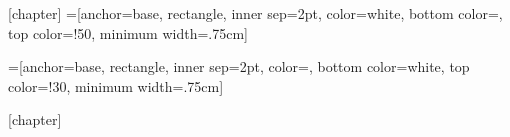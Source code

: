 \makeatother

\newcommand{\resetexos}{\def\exos{0}}

[chapter]
=[anchor=base,%
rectangle,%
inner sep=2pt,%
color=white,
bottom color=\scriptcolor,%
top color=\scriptcolor!50,%
minimum width=.75cm]

\newcommand{\kescht}[1]{\tikz[baseline]{\node[exosty] (exo) {\bfseries\textsf{#1}};}}

\newcommand{\exo}
{\par%
	\refstepcounter{exo}%
	\noindent%
	\tikz[baseline]{\node[exosty] (exo) {\bfseries\textsf{\theexo}};}
}




\newenvironment{exercices}[1][Exercices]
{\phantomsection%
	\addcontentsline{toc}{section}{Exercices}%
	\medskip%
	\btitle{\Large #1}%
	\vspace{-1.75\baselineskip}%
	\begin{multicols}{2}%
		\setenumerate[1]{label=\alph*), ref=\theenumi.\alph*}
		\setenumerate[2]{label=\roman*), ref=\theenumii.\roman*} 
	}
	{\setenumerate[1]{ label=\arabic*. , ref=\arabic*, itemsep=1mm}
		\setenumerate[2]{label=\alph*), ref=\theenumi.\alph*}
		\setenumerate[3]{label=\roman*), ref=\theenumii.\roman*} 
	\end{multicols}%
	\vspace{-.5cm}%
	\noindent\color{\scriptcolor}\rule[0cm]{\textwidth}{1.5pt}%
}



=[anchor=base,%
rectangle,%
inner sep=2pt,%
color=\scriptcolor,%
bottom color=white,%
top color=\scriptcolor!30,%
minimum width=.75cm]

\newcommand{\sol}
{\par%
	\refstepcounter{sol}%
	\noindent%
	\tikz[baseline]{\node[solsty] (sol) {\bfseries\textsf{\thesol}};}
}

[chapter]
\newenvironment{solutions}[1][Solutions]
{\phantomsection%
	\addcontentsline{toc}{section}{Solutions}%
	\medskip%
	\btitleinv{\Large #1}%
	\vspace{-1.75\baselineskip}%
	\begin{multicols}{2}%
		\setenumerate[1]{label=\alph*), ref=\theenumi.\alph*}
		\setenumerate[2]{label=\roman*), ref=\theenumii.\roman*}
	}
	{\setenumerate[1]{ label=\arabic*. , ref=\arabic*, itemsep=1mm}
		\setenumerate[2]{label=\alph*), ref=\theenumi.\alph*}
		\setenumerate[3]{label=\roman*), ref=\theenumii.\roman*} 
	\end{multicols}%
	\vspace{-.5cm}%
	\noindent\color{\scriptcolor}\rule[0cm]{\textwidth}{1.5pt}%
}



